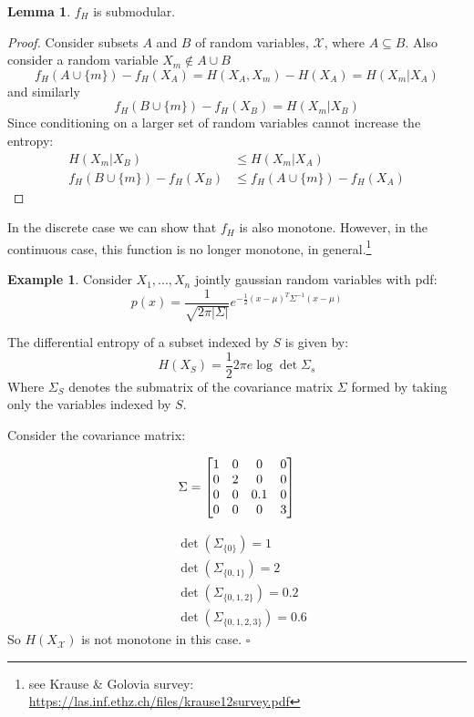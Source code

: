 \documentclass[twoside]{article}
\newcommand*{\QEDB}{\hfill\ensuremath{\square}}%
\theoremstyle{definition}
\newtheorem{example}[theorem]{Example}
\newtheorem{lemma}[theorem]{Lemma}
\newtheorem{note}[theorem]{Note}
\begin{document}
\begin{lemma}
$f_H$ is submodular.
\end{lemma}

\begin{proof}
  Consider subsets $A$ and $B$ of random variables,
  $\mathcal{X}$, where $A \subseteq B$. Also consider a random
  variable $X_m \notin A \cup B$
  $$f_H(A \cup \{m\}) - f_H(X_A) = H(X_A, X_m) - H(X_A) = H(X_m | X_A)$$
  \centering and similarly
  $$f_H(B \cup \{m\}) - f_H(X_B) = H(X_m | X_B)$$
  Since conditioning on a larger set of random variables cannot
  increase the entropy:
  \begin{align*}
    H(X_m | X_B) & \leq H(X_m | X_A) \\
    f_H(B \cup \{m\}) - f_H(X_B) & \leq f_H(A \cup \{m\}) - f_H(X_A)
  \end{align*}
\end{proof}


In the discrete case we can show that $f_H$ is also monotone. However,
in the continuous case, this function is no longer
monotone, in general.\footnote{see Krause \& Golovia survey:
  \href{https://las.inf.ethz.ch/files/krause12survey.pdf}{https://las.inf.ethz.ch/files/krause12survey.pdf}}

\begin{example}
  Consider $X_1, ..., X_n$ jointly gaussian random variables with pdf:
  $$p(x) = \frac{1}{\sqrt{2\pi |\Sigma|}} e^{-\frac{1}{2}(x-\mu)^T
    \Sigma^{-1} (x-\mu)}$$

  The differential entropy of a subset indexed by $S$ is given by:
  $$H(X_S) = \frac{1}{2} 2 \pi e\log \det \Sigma_s$$
  Where $\Sigma_S$ denotes the submatrix of the covariance matrix
  $\Sigma$ formed by taking only the variables indexed by $S$.

  Consider the covariance matrix:

  \begin{align}
    \Sigma =
    \begin{bmatrix}
               1 & 0 & 0 & 0 \\
               0 & 2 & 0 & 0 \\
               0 & 0 & 0.1 & 0 \\
               0 & 0 & 0 & 3  \notag
             \end{bmatrix}
  \end{align}

  \begin{align*}
    & \det(\Sigma_{\{0\}}) = 1\\
    & \det(\Sigma_{\{0, 1\}}) = 2\\
    & \det(\Sigma_{\{0, 1, 2\}}) = 0.2\\
    & \det(\Sigma_{\{0, 1, 2, 3\}}) = 0.6
  \end{align*}
  So $H(X_\mathcal{X})$ is not monotone in this case.
  \QEDB
\end{example}
\end{document}
